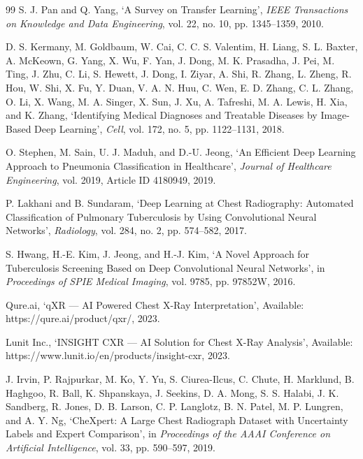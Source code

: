 \documentclass[12pt, a4paper, oneside]{report}
\begin{document}
\begin{thebibliography}{99}
S. J. Pan and Q. Yang, `A Survey on Transfer Learning', \textit{IEEE Transactions on Knowledge and Data Engineering}, vol. 22, no. 10, pp. 1345--1359, 2010.

D. S. Kermany, M. Goldbaum, W. Cai, C. C. S. Valentim, H. Liang, S. L. Baxter, A. McKeown, G. Yang, X. Wu, F. Yan, J. Dong, M. K. Prasadha, J. Pei, M. Ting, J. Zhu, C. Li, S. Hewett, J. Dong, I. Ziyar, A. Shi, R. Zhang, L. Zheng, R. Hou, W. Shi, X. Fu, Y. Duan, V. A. N. Huu, C. Wen, E. D. Zhang, C. L. Zhang, O. Li, X. Wang, M. A. Singer, X. Sun, J. Xu, A. Tafreshi, M. A. Lewis, H. Xia, and K. Zhang, `Identifying Medical Diagnoses and Treatable Diseases by Image-Based Deep Learning', \textit{Cell}, vol. 172, no. 5, pp. 1122--1131, 2018.

O. Stephen, M. Sain, U. J. Maduh, and D.-U. Jeong, `An Efficient Deep Learning Approach to Pneumonia Classification in Healthcare', \textit{Journal of Healthcare Engineering}, vol. 2019, Article ID 4180949, 2019.

P. Lakhani and B. Sundaram, `Deep Learning at Chest Radiography: Automated Classification of Pulmonary Tuberculosis by Using Convolutional Neural Networks', \textit{Radiology}, vol. 284, no. 2, pp. 574--582, 2017.

S. Hwang, H.-E. Kim, J. Jeong, and H.-J. Kim, `A Novel Approach for Tuberculosis Screening Based on Deep Convolutional Neural Networks', in \textit{Proceedings of SPIE Medical Imaging}, vol. 9785, pp. 97852W, 2016.

Qure.ai, `qXR --- AI Powered Chest X-Ray Interpretation', Available: https://qure.ai/product/qxr/, 2023.

Lunit Inc., `INSIGHT CXR --- AI Solution for Chest X-Ray Analysis', Available: https://www.lunit.io/en/products/insight-cxr, 2023.

J. Irvin, P. Rajpurkar, M. Ko, Y. Yu, S. Ciurea-Ilcus, C. Chute, H. Marklund, B. Haghgoo, R. Ball, K. Shpanskaya, J. Seekins, D. A. Mong, S. S. Halabi, J. K. Sandberg, R. Jones, D. B. Larson, C. P. Langlotz, B. N. Patel, M. P. Lungren, and A. Y. Ng, `CheXpert: A Large Chest Radiograph Dataset with Uncertainty Labels and Expert Comparison', in \textit{Proceedings of the AAAI Conference on Artificial Intelligence}, vol. 33, pp. 590--597, 2019.

\end{thebibliography}
\end{document}
